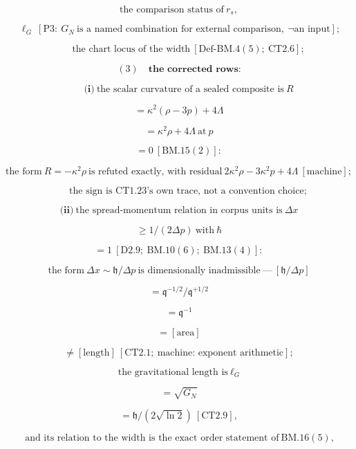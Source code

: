 \documentclass[11pt,openany]{report}
\theoremstyle{canonplain}
\theoremstyle{canondef}
\begin{document}
\[
\text{the comparison status of}\ r_s,
\]

\[
\ \ell_G\ [\mathrm{P3}:\ G_N\ \text{is a named combination for external comparison},\ \neg\text{an input}];
\]

\[
\qquad \text{the chart locus of the width}\ [\mathrm{Def\text{-}BM.4}(5);\ \mathrm{CT2.6}];
\]

\[
(3)\quad\textbf{the corrected rows:}
\]

\[
\qquad \textbf{(i)}\ \text{the scalar curvature of a sealed composite is}\ R
\]

\[
= \kappa^2(\rho-3p)+4\Lambda
\]

\[
= \kappa^2\rho+4\Lambda\ \text{at}\ p
\]

\[
= 0\ [\mathrm{BM.15}(2)]:
\]

\[
\text{the form}\ R=-\kappa^2\rho\ \text{is refuted exactly, with residual}\ 2\kappa^2\rho-3\kappa^2p+4\Lambda\ [\text{machine}];
\]

\[
\qquad \text{the sign is CT1.23's own trace, not a convention choice};
\]

\[
\textbf{(ii)}\ \text{the spread-momentum relation in corpus units is}\ \Delta x
\]

\[
\ge 1/(2\Delta p)\ \text{with}\ \hbar
\]

\[
= 1\ [\mathrm{D2.9};\ \mathrm{BM.10}(6);\ \mathrm{BM.13}(4)]:
\]

\[
\text{the form}\ \Delta x\sim\mathfrak h/\Delta p\ \text{is dimensionally inadmissible}\ —\ [\mathfrak h/\Delta p]
\]

\[
= \mathfrak q^{-1/2}/\mathfrak q^{+1/2}
\]

\[
= \mathfrak q^{-1}
\]

\[
= [\text{area}]
\]

\[
\ne [\text{length}]\ [\mathrm{CT2.1};\ \text{machine: exponent arithmetic}];
\]

\[
\text{the gravitational length is}\ \ell_G
\]

\[
= \sqrt{G_N}
\]

\[
= \mathfrak h/(2\sqrt{\ln2})\ [\mathrm{CT2.9}],
\]

\[
\ \text{and its relation to the width is the exact order statement of}\ \mathrm{BM.16}(5),
\]
\end{document}
